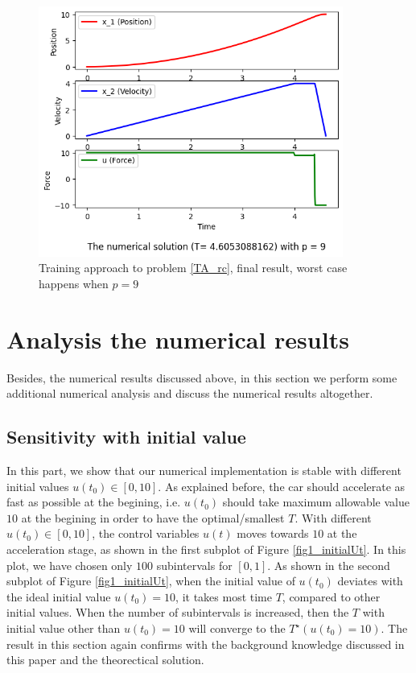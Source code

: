 \documentclass  [
  paper    = a4,
  BCOR     = 10mm,
  twoside,
  fontsize = 12pt,
  fleqn,
  toc      = bibnumbered,
  toc      = listofnumbered,
  numbers  = noendperiod,
  headings = normal,
  listof   = leveldown,
  version  = 3.03
]                                       {scrreprt}
\newcommand{\<}{\langle}
\renewcommand{\>}{\rangle}
\begin{document}
\begin{figure}[h]
	\centerline{\includegraphics[width=10cm]{original_u10_p9.png}}
	\caption{Training approach to problem \ref{TA_rc}, final result, worst case happens when $p=9$}
	\label{fig1_ta_final}
\end{figure}




\section{Analysis the numerical results}
\label{Sec_NR}

Besides, the numerical results discussed above, in this section we perform some additional numerical analysis and discuss the numerical results altogether. 

\subsection{Sensitivity with initial value}
In this part, we show that our numerical implementation is stable with different initial values $u(t_0) \in [0,10]$. As explained before, the car should accelerate as fast as possible at the begining, i.e. $u(t_0)$ should take maximum allowable value $10$ at the begining in order to have the optimal/smallest $T$. With different $u(t_0) \in [0,10]$, the control variables $u(t)$ moves towards $10$ at the acceleration stage, as shown in the first subplot of Figure \ref{fig1_initialUt}. In this plot, we have chosen only $100$ subintervals for $[0,1]$. As shown in the second subplot of Figure \ref{fig1_initialUt}, when the initial value of $u(t_0)$ deviates with the ideal initial value $u(t_0)=10$, it takes most time $T$, compared to other initial values. When the number of subintervals is increased, then the $T$ with initial value other than $u(t_0)=10$ will converge to the $T^\star(u(t_0)=10)$. The result in this section again confirms with the background knowledge discussed in this paper and the theorectical solution. 
\end{document}
